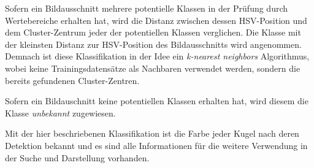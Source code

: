 Sofern ein Bildausschnitt mehrere potentielle Klassen in der Prüfung durch Wertebereiche erhalten hat, wird die Distanz
zwischen dessen HSV-Position und dem Cluster-Zentrum jeder der potentiellen Klassen verglichen.
Die Klasse mit der kleinsten Distanz zur HSV-Position des Bildausschnitts wird angenommen.
Demnach ist diese Klassifikation in der Idee ein \emph{k-nearest neighbors} Algorithmus\cite{wiki:k_nearest_neighbors},
wobei keine Trainingsdatensätze als Nachbaren verwendet werden, sondern die bereits gefundenen Cluster-Zentren.

Sofern ein Bildauschnitt keine potentiellen Klassen erhalten hat, wird diesem die Klasse \emph{unbekannt} zugewiesen.

Mit der hier beschriebenen Klassifikation ist die Farbe jeder Kugel nach deren Detektion bekannt und es
sind alle Informationen für die weitere Verwendung in der Suche und Darstellung vorhanden.
